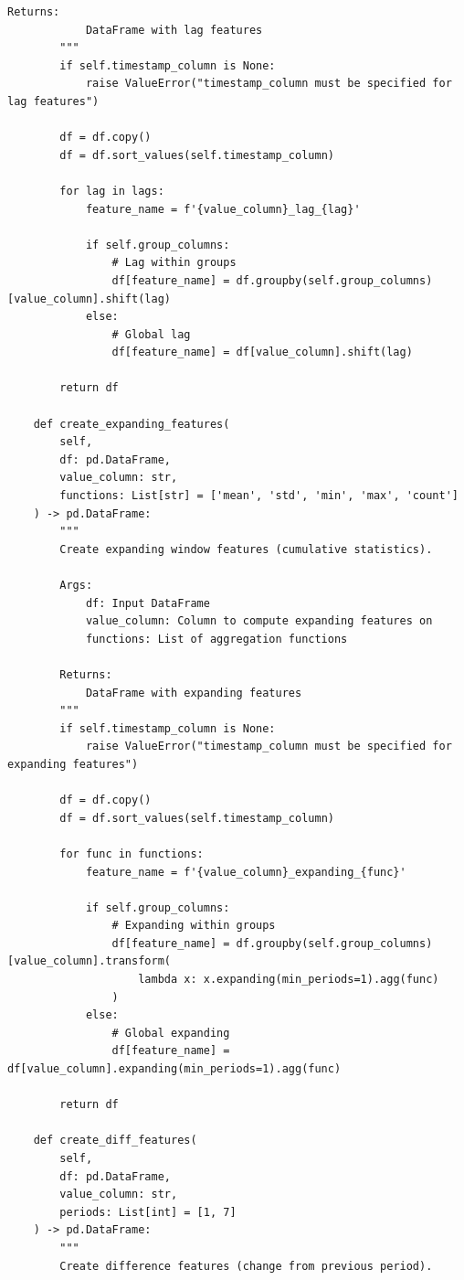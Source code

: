 \begin{lstlisting}[style=python, caption={Scalable Aggregation and Rolling Window Features}]
        Returns:
            DataFrame with lag features
        """
        if self.timestamp_column is None:
            raise ValueError("timestamp_column must be specified for lag features")

        df = df.copy()
        df = df.sort_values(self.timestamp_column)

        for lag in lags:
            feature_name = f'{value_column}_lag_{lag}'

            if self.group_columns:
                # Lag within groups
                df[feature_name] = df.groupby(self.group_columns)[value_column].shift(lag)
            else:
                # Global lag
                df[feature_name] = df[value_column].shift(lag)

        return df

    def create_expanding_features(
        self,
        df: pd.DataFrame,
        value_column: str,
        functions: List[str] = ['mean', 'std', 'min', 'max', 'count']
    ) -> pd.DataFrame:
        """
        Create expanding window features (cumulative statistics).

        Args:
            df: Input DataFrame
            value_column: Column to compute expanding features on
            functions: List of aggregation functions

        Returns:
            DataFrame with expanding features
        """
        if self.timestamp_column is None:
            raise ValueError("timestamp_column must be specified for expanding features")

        df = df.copy()
        df = df.sort_values(self.timestamp_column)

        for func in functions:
            feature_name = f'{value_column}_expanding_{func}'

            if self.group_columns:
                # Expanding within groups
                df[feature_name] = df.groupby(self.group_columns)[value_column].transform(
                    lambda x: x.expanding(min_periods=1).agg(func)
                )
            else:
                # Global expanding
                df[feature_name] = df[value_column].expanding(min_periods=1).agg(func)

        return df

    def create_diff_features(
        self,
        df: pd.DataFrame,
        value_column: str,
        periods: List[int] = [1, 7]
    ) -> pd.DataFrame:
        """
        Create difference features (change from previous period).


\end{lstlisting}
